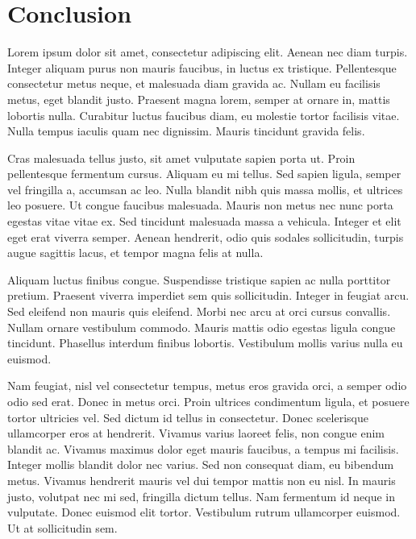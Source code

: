 \chapter{Conclusion}

Lorem ipsum dolor sit amet, consectetur adipiscing elit. Aenean nec diam turpis. Integer aliquam purus non mauris faucibus, in luctus ex tristique. Pellentesque consectetur metus neque, et malesuada diam gravida ac. Nullam eu facilisis metus, eget blandit justo. Praesent magna lorem, semper at ornare in, mattis lobortis nulla. Curabitur luctus faucibus diam, eu molestie tortor facilisis vitae. Nulla tempus iaculis quam nec dignissim. Mauris tincidunt gravida felis.

Cras malesuada tellus justo, sit amet vulputate sapien porta ut. Proin pellentesque fermentum cursus. Aliquam eu mi tellus. Sed sapien ligula, semper vel fringilla a, accumsan ac leo. Nulla blandit nibh quis massa mollis, et ultrices leo posuere. Ut congue faucibus malesuada. Mauris non metus nec nunc porta egestas vitae vitae ex. Sed tincidunt malesuada massa a vehicula. Integer et elit eget erat viverra semper. Aenean hendrerit, odio quis sodales sollicitudin, turpis augue sagittis lacus, et tempor magna felis at nulla.

Aliquam luctus finibus congue. Suspendisse tristique sapien ac nulla porttitor pretium. Praesent viverra imperdiet sem quis sollicitudin. Integer in feugiat arcu. Sed eleifend non mauris quis eleifend. Morbi nec arcu at orci cursus convallis. Nullam ornare vestibulum commodo. Mauris mattis odio egestas ligula congue tincidunt. Phasellus interdum finibus lobortis. Vestibulum mollis varius nulla eu euismod.

Nam feugiat, nisl vel consectetur tempus, metus eros gravida orci, a semper odio odio sed erat. Donec in metus orci. Proin ultrices condimentum ligula, et posuere tortor ultricies vel. Sed dictum id tellus in consectetur. Donec scelerisque ullamcorper eros at hendrerit. Vivamus varius laoreet felis, non congue enim blandit ac. Vivamus maximus dolor eget mauris faucibus, a tempus mi facilisis. Integer mollis blandit dolor nec varius. Sed non consequat diam, eu bibendum metus. Vivamus hendrerit mauris vel dui tempor mattis non eu nisl. In mauris justo, volutpat nec mi sed, fringilla dictum tellus. Nam fermentum id neque in vulputate. Donec euismod elit tortor. Vestibulum rutrum ullamcorper euismod. Ut at sollicitudin sem.